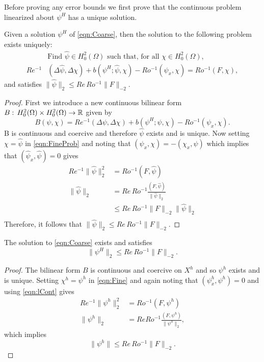 Before proving any error bounds we first prove that the continuous problem
linearized about $\psi^H$ has a unique solution.
\begin{lemma}\label{lma:Fine}
  Given a solution $\psi^H$ of \eqref{eqn:Coarse}, then the solution to the
  following problem exists uniquely:
    \begin{equation}
      \begin{split}
        &\text{Find } \hat{\psi} \in H^2_0(\Omega) \text{ such that, for all }
          \chi\in H^2_0(\Omega), \\
        Re^{-1}&(\Delta \hat{\psi}, \Delta \chi)
          + b(\psi^H; \hat{\psi}, \chi)
          - Ro^{-1} (\hat{\psi}_x,\chi)
          = Ro^{-1} (F,\chi),
      \end{split}
      \label{eqn:FineProb}
    \end{equation}
    and satisfies $\|\hat{\psi}\|_2 \le Re\, Ro^{-1} \|F\|_{-2}$.
\end{lemma}
\begin{proof}
  First we introduce a new continuous bilinear form $B:\, H^2_0(\Omega) \times
  H^2_0(\Omega) \to \mathbb{R}$ given by
  \begin{equation*}
    B(\psi,\chi) = Re^{-1} (\Delta \psi, \Delta \chi)
      + b(\psi^H;\psi,\chi)
      - Ro^{-1} (\psi_x,\chi).
  \end{equation*}
  B is continuous and coercive and therefore $\hat{\psi}$ exists and is unique.
  Now setting $\chi=\hat{\psi}$ in \eqref{eqn:FineProb} and noting that
  $(\psi_x,\chi) = -(\chi_x,\psi)$ which implies that
  $(\hat{\psi}_x,\hat{\psi}) = 0$ gives
  \begin{align*}
    Re^{-1} \|\hat{\psi}\|_2^2 &= Ro^{-1} (F,\hat{\psi}) \\
    \|\hat{\psi}\|_2 &= Re\, Ro^{-1} \frac{(F,\hat{\psi})}{\|\hat{\psi}\|_2} \\
    &\le Re\, Ro^{-1} \|F\|_{-2}\|\hat{\psi}\|_2 \\
  \end{align*}
  Therefore, it follows that $\|\hat{\psi}\|_2 \le Re\, Ro^{-1} \|F\|_{-2}$.
\end{proof}
\begin{lemma} \label{lma:Fineh}
  The solution to \eqref{eqn:Coarse} exists and satisfies
  \begin{equation*}
    \|\psi^H\|_2 \le Re\, Ro^{-1} \|F\|_{-2}.
  \end{equation*}
\end{lemma}
\begin{proof}
  The bilinear form $B$ is continuous and coercive on $X^h$ and so $\psi^h$
  exists and is unique. Setting $\chi^h=\psi^h$ in \eqref{eqn:Fine} and again
  noting that $(\psi_x^h,\psi^h)=0$ and using \eqref{eqn:lCont} gives
  \begin{align*}
    Re^{-1} \|\psi^h\|_2^2 &= Ro^{-1} (F,\psi^h) \\
    \|\psi^h\|_2 &= Re Ro^{-1} \frac{(F,\psi^h)}{\|\psi^h\|_2},
  \end{align*}
  which implies
  \begin{equation*}
    \|\psi^h\| \le Re\, Ro^{-1} \|F\|_{-2}.
  \end{equation*}
\end{proof}

